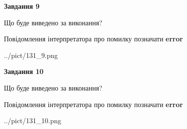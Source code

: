 \documentclass[12pt, ukrainian]{article}
\begin{document}
{{\begin {center}\textbf{Завдання 9}\end {center}}\par
Що буде виведено за виконання? \par
Повідомлення інтерпретатора про помилку позначати \textbf{error}

\begin{center}
	{../pict/131_9.png}
\end{center}
\newpage

{\begin {center}\textbf{Завдання 10}\end {center}}\par
Що буде виведено за виконання? \par
Повідомлення інтерпретатора про помилку позначати \textbf{error}

\begin{center}
	{../pict/131_10.png}
\end{center}
\newpage

}
\end{document}
